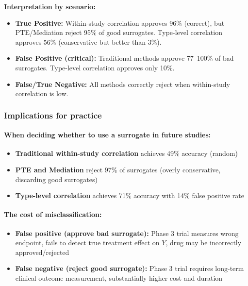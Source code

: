 \documentclass{article}
\begin{document}
\textbf{Interpretation by scenario:}
\begin{itemize}
    \item \textbf{True Positive:} Within-study correlation approves 96\% (correct), but PTE/Mediation reject 95\% of good surrogates. Type-level correlation approves 56\% (conservative but better than 3\%).

    \item \textbf{False Positive (critical):} Traditional methods approve 77--100\% of bad surrogates. Type-level correlation approves only 10\%.

    \item \textbf{False/True Negative:} All methods correctly reject when within-study correlation is low.
\end{itemize}

\subsubsection{Implications for practice}

\paragraph{When deciding whether to use a surrogate in future studies:}
\begin{itemize}
    \item \textbf{Traditional within-study correlation} achieves 49\% accuracy (random)
    \item \textbf{PTE and Mediation} reject 97\% of surrogates (overly conservative, discarding good surrogates)
    \item \textbf{Type-level correlation} achieves 71\% accuracy with 14\% false positive rate
\end{itemize}

\paragraph{The cost of misclassification:}
\begin{itemize}
    \item \textbf{False positive (approve bad surrogate):} Phase 3 trial measures wrong endpoint, fails to detect true treatment effect on $Y$, drug may be incorrectly approved/rejected
    \item \textbf{False negative (reject good surrogate):} Phase 3 trial requires long-term clinical outcome measurement, substantially higher cost and duration
\end{itemize}
\end{document}

